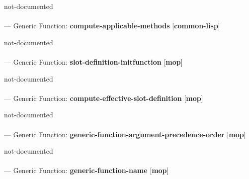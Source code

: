 \begin{adjustwidth}{5em}{5em}
not-documented
\end{adjustwidth}

\paragraph{}
\label{COMMON-LISP:COMPUTE-APPLICABLE-METHODS}
--- Generic Function: \textbf{compute-applicable-methods} [\textbf{common-lisp}] \textit{}

\begin{adjustwidth}{5em}{5em}
not-documented
\end{adjustwidth}

\paragraph{}
\label{MOP:SLOT-DEFINITION-INITFUNCTION}
--- Generic Function: \textbf{slot-definition-initfunction} [\textbf{mop}] \textit{}

\begin{adjustwidth}{5em}{5em}
not-documented
\end{adjustwidth}

\paragraph{}
\label{MOP:COMPUTE-EFFECTIVE-SLOT-DEFINITION}
--- Generic Function: \textbf{compute-effective-slot-definition} [\textbf{mop}] \textit{}

\begin{adjustwidth}{5em}{5em}
not-documented
\end{adjustwidth}

\paragraph{}
\label{MOP:GENERIC-FUNCTION-ARGUMENT-PRECEDENCE-ORDER}
--- Generic Function: \textbf{generic-function-argument-precedence-order} [\textbf{mop}] \textit{}

\begin{adjustwidth}{5em}{5em}
not-documented
\end{adjustwidth}

\paragraph{}
\label{MOP:GENERIC-FUNCTION-NAME}
--- Generic Function: \textbf{generic-function-name} [\textbf{mop}] \textit{}

